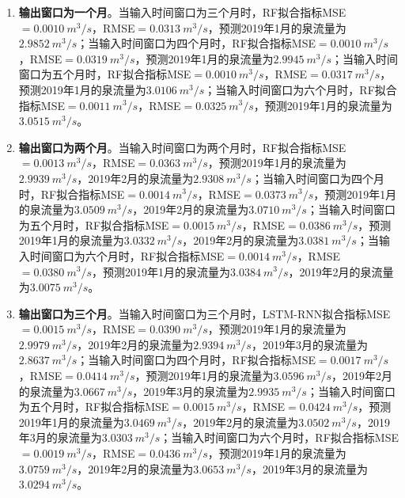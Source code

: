\begin{enumerate}
    \begin{enumerate}
      \item \textbf{输出窗口为一个月}。当输入时间窗口为三个月时，RF拟合指标MSE$=\SI{0.0010}{m^{3}/s}$，RMSE$=\SI{0.0313}{m^{3}/s}$，预测2019年1月的泉流量为$\SI{2.9852}{m^{3}/s}$；当输入时间窗口为四个月时，RF拟合指标MSE$=\SI{0.0010}{m^{3}/s}$，RMSE$=\SI{0.0319}{m^{3}/s}$，预测2019年1月的泉流量为$\SI{2.9945}{m^{3}/s}$；当输入时间窗口为五个月时，RF拟合指标MSE$=\SI{0.0010}{m^{3}/s}$，RMSE$=\SI{0.0317}{m^{3}/s}$，预测2019年1月的泉流量为$\SI{3.0106}{m^{3}/s}$；当输入时间窗口为六个月时，RF拟合指标MSE$=\SI{0.0011}{m^{3}/s}$，RMSE$=\SI{0.0325}{m^{3}/s}$，预测2019年1月的泉流量为$\SI{3.0515}{m^{3}/s}$。
      \item \textbf{输出窗口为两个月}。当输入时间窗口为两个月时，RF拟合指标MSE$=\SI{0.0013}{m^{3}/s}$，RMSE$=\SI{0.0363}{m^{3}/s}$，预测2019年1月的泉流量为$\SI{2.9939}{m^{3}/s}$，2019年2月的泉流量为$\SI{2.9308}{m^{3}/s}$；当输入时间窗口为四个月时，RF拟合指标MSE$=\SI{0.0014}{m^{3}/s}$，RMSE$=\SI{0.0373}{m^{3}/s}$，预测2019年1月的泉流量为$\SI{3.0509}{m^{3}/s}$，2019年2月的泉流量为$\SI{3.0710}{m^{3}/s}$；当输入时间窗口为五个月时，RF拟合指标MSE$=\SI{0.0015}{m^{3}/s}$，RMSE$=\SI{0.0386}{m^{3}/s}$，预测2019年1月的泉流量为$\SI{3.0332}{m^{3}/s}$，2019年2月的泉流量为$\SI{3.0381}{m^{3}/s}$；当输入时间窗口为六个月时，RF拟合指标MSE$=\SI{0.0014}{m^{3}/s}$，RMSE$=\SI{0.0380}{m^{3}/s}$，预测2019年1月的泉流量为$\SI{3.0384}{m^{3}/s}$，2019年2月的泉流量为$\SI{3.0075}{m^{3}/s}$。
      \item \textbf{输出窗口为三个月}。当输入时间窗口为三个月时，LSTM-RNN拟合指标MSE$=\SI{0.0015}{m^{3}/s}$，RMSE$=\SI{0.0390}{m^{3}/s}$，预测2019年1月的泉流量为$\SI{2.9979}{m^{3}/s}$，2019年2月的泉流量为$\SI{2.9394}{m^{3}/s}$，2019年3月的泉流量为$\SI{2.8637}{m^{3}/s}$；当输入时间窗口为四个月时，RF拟合指标MSE$=\SI{0.0017}{m^{3}/s}$，RMSE$=\SI{0.0414}{m^{3}/s}$，预测2019年1月的泉流量为$\SI{3.0596}{m^{3}/s}$，2019年2月的泉流量为$\SI{3.0667}{m^{3}/s}$，2019年3月的泉流量为$\SI{2.9935}{m^{3}/s}$；当输入时间窗口为五个月时，RF拟合指标MSE$=\SI{0.0015}{m^{3}/s}$，RMSE$=\SI{0.0424}{m^{3}/s}$，预测2019年1月的泉流量为$\SI{3.0469}{m^{3}/s}$，2019年2月的泉流量为$\SI{3.0502}{m^{3}/s}$，2019年3月的泉流量为$\SI{3.0303}{m^{3}/s}$；当输入时间窗口为六个月时，RF拟合指标MSE$=\SI{0.0019}{m^{3}/s}$，RMSE$=\SI{0.0436}{m^{3}/s}$，预测2019年1月的泉流量为$\SI{3.0759}{m^{3}/s}$，2019年2月的泉流量为$\SI{3.0653}{m^{3}/s}$，2019年3月的泉流量为$\SI{3.0294}{m^{3}/s}$。

\end{enumerate}
\end{enumerate}

